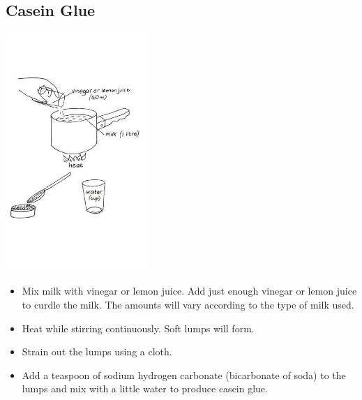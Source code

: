 \begin{multicols}{2}
\section{Casein Glue}

\begin{center}
\includegraphics[width=0.4\textwidth]{./img/vso/casein-glue.jpg}
\end{center}

\begin{itemize}
\item Mix milk with vinegar or lemon
juice. Add just enough vinegar
or lemon juice to curdle the
milk. The amounts will vary
according to the type of milk
used.
\item Heat while stirring
continuously. Soft lumps will
form.
\item Strain out the lumps using a
cloth.
\item Add a teaspoon of sodium
hydrogen carbonate
(bicarbonate of soda) to the
lumps and mix with a little
water to produce casein glue.
\end{itemize}


\end{multicols}